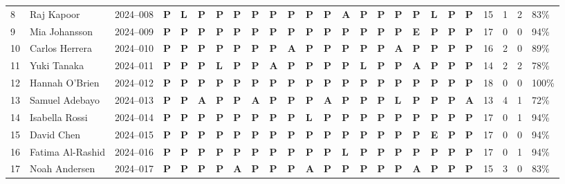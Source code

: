 \documentclass[12pt,landscape]{article}
\newcommand{\mkP}{\textcolor{green!50!black}{\textbf{P}}}
\newcommand{\mkA}{\textcolor{red!60!black}{\textbf{A}}}
\newcommand{\mkL}{\textcolor{orange!70!black}{\textbf{L}}}
\newcommand{\mkE}{\textcolor{secondary}{\textbf{E}}}
\begin{document}
\begin{longtable}{C{0.40cm} L{4.05cm} C{1.60cm} *{18}{C{0.78cm}} C{0.60cm} C{0.60cm} C{0.60cm} C{0.70cm}}
8 & Raj Kapoor         & 2024--008 &
\mkP & \mkL & \mkP & \mkP & \mkP & \mkP &
\mkP & \mkP & \mkP & \mkP & \mkA & \mkP &
\mkP & \mkP & \mkP & \mkL & \mkP & \mkP &
15 & 1 & 2 & 83\% \\

9 & Mia Johansson      & 2024--009 &
\mkP & \mkP & \mkP & \mkP & \mkP & \mkP &
\mkP & \mkP & \mkP & \mkP & \mkP & \mkP &
\mkP & \mkP & \mkE & \mkP & \mkP & \mkP &
17 & 0 & 0 & 94\% \\

10 & Carlos Herrera     & 2024--010 &
\mkP & \mkP & \mkP & \mkP & \mkP & \mkP &
\mkP & \mkA & \mkP & \mkP & \mkP & \mkP &
\mkP & \mkA & \mkP & \mkP & \mkP & \mkP &
16 & 2 & 0 & 89\% \\

11 & Yuki Tanaka        & 2024--011 &
\mkP & \mkP & \mkP & \mkL & \mkP & \mkP &
\mkA & \mkP & \mkP & \mkP & \mkP & \mkL &
\mkP & \mkP & \mkA & \mkP & \mkP & \mkP &
14 & 2 & 2 & 78\% \\

12 & Hannah O'Brien     & 2024--012 &
\mkP & \mkP & \mkP & \mkP & \mkP & \mkP &
\mkP & \mkP & \mkP & \mkP & \mkP & \mkP &
\mkP & \mkP & \mkP & \mkP & \mkP & \mkP &
18 & 0 & 0 & 100\% \\

13 & Samuel Adebayo     & 2024--013 &
\mkP & \mkP & \mkA & \mkP & \mkP & \mkA &
\mkP & \mkP & \mkP & \mkA & \mkP & \mkP &
\mkP & \mkL & \mkP & \mkP & \mkP & \mkA &
13 & 4 & 1 & 72\% \\

14 & Isabella Rossi     & 2024--014 &
\mkP & \mkP & \mkP & \mkP & \mkP & \mkP &
\mkP & \mkP & \mkL & \mkP & \mkP & \mkP &
\mkP & \mkP & \mkP & \mkP & \mkP & \mkP &
17 & 0 & 1 & 94\% \\

15 & David Chen         & 2024--015 &
\mkP & \mkP & \mkP & \mkP & \mkP & \mkP &
\mkP & \mkP & \mkP & \mkP & \mkP & \mkP &
\mkP & \mkP & \mkP & \mkE & \mkP & \mkP &
17 & 0 & 0 & 94\% \\

16 & Fatima Al-Rashid   & 2024--016 &
\mkP & \mkP & \mkP & \mkP & \mkP & \mkP &
\mkP & \mkP & \mkP & \mkP & \mkL & \mkP &
\mkP & \mkP & \mkP & \mkP & \mkP & \mkP &
17 & 0 & 1 & 94\% \\

17 & Noah Andersen      & 2024--017 &
\mkP & \mkP & \mkP & \mkP & \mkA & \mkP &
\mkP & \mkP & \mkA & \mkP & \mkP & \mkP &
\mkP & \mkP & \mkA & \mkP & \mkP & \mkP &
15 & 3 & 0 & 83\% \\


\end{longtable}
\end{document}
